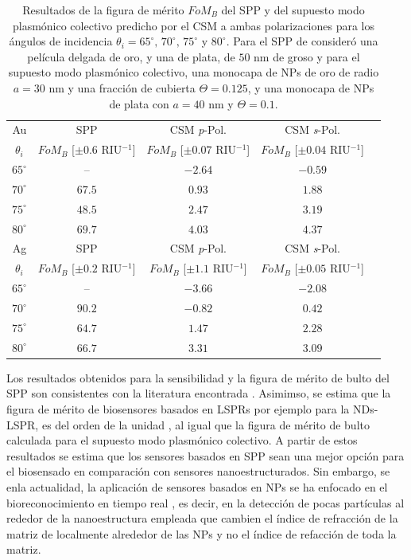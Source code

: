\begin{table}[h!]
\centering
\caption{Resultados de la figura de mérito $\textit{FoM}_B$ del SPP y del supuesto modo  plasmónico colectivo predicho por el CSM a ambas polarizaciones para los ángulos de incidencia $\theta_i = 65^\circ,\,70^\circ,\, 75^\circ$ y $80^\circ$. Para el SPP de consideró una película delgada de oro, y una de plata, de $50$ nm de groso y para el supuesto modo  plasmónico colectivo, una monocapa de NPs de oro de radio $a=30$ nm y una fracción de cubierta $\Theta=0.125$, y una monocapa de NPs de plata con $a=40$ nm y $\Theta=0.1$.}\vspace*{-.7em}
\label{tab:FOM}\small
\begin{tabular}{c||c||ccc}
Au & SPP  & CSM \emph{p}-Pol. 	& CSM \emph{s}-Pol. \\ 
$\theta_i$ &  $\textit{FoM}_B$ [$\pm 0.6$ RIU$^{-1}$]	  &  $\textit{FoM}_B$ [$\pm 0.07$ RIU$^{-1}$]		&  $\textit{FoM}_B$  [$\pm 0.04$ RIU$^{-1}$]\\ \hline
$65^\circ$ & --			  &	$-2.64$ & $-0.59$\\
$70^\circ$ & $67.5$ &	$0.93$ & $1.88$\\
$75^\circ$ & $48.5$ &	$2.47$ & $3.19$\\
$80^\circ$ & $69.7$ &	$4.03$ & $4.37$\\
\hline \hline
Ag & SPP  & CSM \emph{p}-Pol. 	& CSM \emph{s}-Pol. \\ 
$\theta_i$ &  $\textit{FoM}_B$ [$\pm 0.2$ RIU$^{-1}$]	  &  $\textit{FoM}_B$ [$\pm 1.1$ RIU$^{-1}$]		&  $\textit{FoM}_B$  [$\pm 0.05$ RIU$^{-1}$]\\ \hline
$65^\circ$ & -- 			  &	$-3.66$ & $-2.08$\\
$70^\circ$ & $90.2$ &	$-0.82$ & $0.42$\\
$75^\circ$ & $64.7$ &	$1.47$  & $2.28$\\
$80^\circ$ & $66.7$ &	$3.31$  & $3.09$
\end{tabular}
\end{table}


Los resultados obtenidos para la sensibilidad y la figura de mérito de bulto del SPP son consistentes con la literatura encontrada \cite{estevez2014trends,danilov2018ultra,svedendahl2009refractometric}. Asimimso, se estima que la figura de mérito de biosensores basados en LSPRs por ejemplo para la NDs-LSPR, es del orden de la unidad \cite{svedendahl2009refractometric}, al igual que la figura de mérito de bulto calculada para el supuesto modo  plasmónico colectivo. A partir de estos resultados se estima que los sensores basados en SPP sean una mejor opción para el biosensado en comparación con sensores nanoestructurados. Sin embargo, se enla actualidad, la aplicación de sensores basados en NPs  se ha enfocado en el bioreconocimiento en tiempo real \cite{estevez2014trends,svedendahl2009refractometric}, es decir, en la detección de pocas partículas al rededor de la nanoestructura empleada que cambien el índice de refracción de la matriz de localmente alrededor de las NPs y no el índice de refacción de toda la matriz. 

